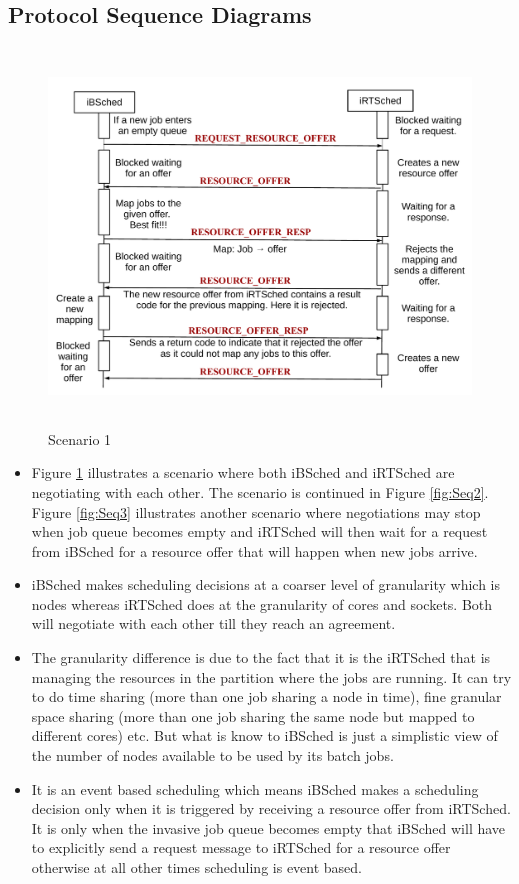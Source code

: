 \subsection{Protocol Sequence Diagrams}
\begin{figure}[!t]
\centering
\includegraphics[width=1.0\textwidth, height=100mm]{./figures/scenario1.pdf}
\caption{Scenario 1}
\label{fig:Seq1}
\end{figure}
\begin{itemize}
\item Figure \ref{fig:Seq1} illustrates a scenario where both iBSched and iRTSched are negotiating with each other. The scenario is continued in Figure \ref{fig:Seq2}. Figure \ref{fig:Seq3} illustrates another scenario where negotiations may stop when job queue becomes empty and iRTSched will then wait for a request from iBSched for a resource offer that will happen when new jobs arrive.
\item iBSched makes scheduling decisions at a coarser level of granularity which is nodes whereas iRTSched does at the granularity of cores and sockets. Both will negotiate with each other till they reach an agreement.
\item The granularity difference is due to the fact that it is the iRTSched that is managing the resources in the partition where the jobs are running. It can try to do time sharing (more than one job sharing a node in time), fine granular space sharing (more than one job sharing the same node but mapped to different cores) etc. But what is know to iBSched is just a simplistic view of the number of nodes available to be used by its batch jobs.
\item It is an event based scheduling which means iBSched makes a scheduling decision only when it is triggered by receiving a resource offer from iRTSched. It is only when the invasive job queue becomes empty that iBSched will have to explicitly send a request message to iRTSched for a resource offer otherwise at all other times scheduling is event based.
\end{itemize}
